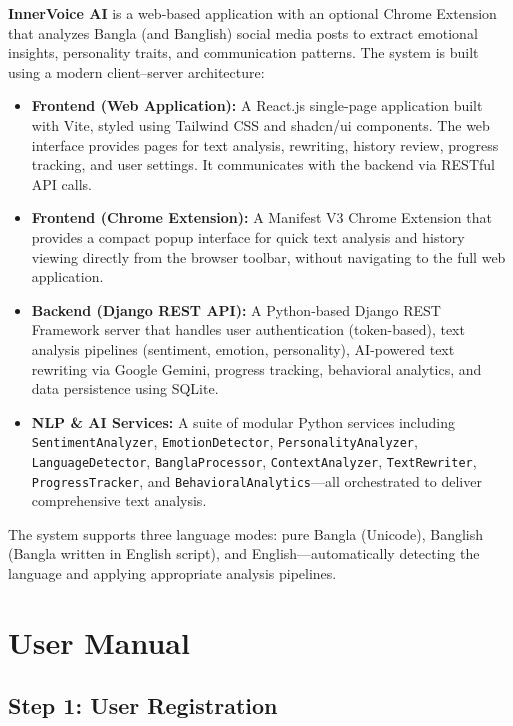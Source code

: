 \documentclass[12pt,a4paper]{report}
\begin{document}
\begin{itemize}
\textbf{InnerVoice AI} is a web-based application with an optional Chrome Extension that analyzes Bangla (and Banglish) social media posts to extract emotional insights, personality traits, and communication patterns. The system is built using a modern client--server architecture:

\begin{itemize}
    \item \textbf{Frontend (Web Application):} A React.js single-page application built with Vite, styled using Tailwind CSS and shadcn/ui components. The web interface provides pages for text analysis, rewriting, history review, progress tracking, and user settings. It communicates with the backend via RESTful API calls.
    
    \item \textbf{Frontend (Chrome Extension):} A Manifest V3 Chrome Extension that provides a compact popup interface for quick text analysis and history viewing directly from the browser toolbar, without navigating to the full web application.
    
    \item \textbf{Backend (Django REST API):} A Python-based Django REST Framework server that handles user authentication (token-based), text analysis pipelines (sentiment, emotion, personality), AI-powered text rewriting via Google Gemini, progress tracking, behavioral analytics, and data persistence using SQLite.
    
    \item \textbf{NLP \& AI Services:} A suite of modular Python services including \texttt{SentimentAnalyzer}, \texttt{EmotionDetector}, \texttt{PersonalityAnalyzer}, \texttt{LanguageDetector}, \texttt{BanglaProcessor}, \texttt{ContextAnalyzer}, \texttt{TextRewriter}, \texttt{ProgressTracker}, and \texttt{BehavioralAnalytics}---all orchestrated to deliver comprehensive text analysis.
\end{itemize}

The system supports three language modes: pure Bangla (Unicode), Banglish (Bangla written in English script), and English---automatically detecting the language and applying appropriate analysis pipelines.

\section{User Manual}

\subsection{Step 1: User Registration}


\end{itemize}
\end{document}
